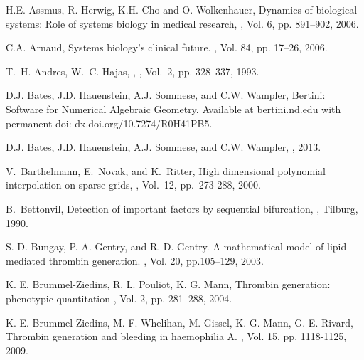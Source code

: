 \begin{thebibliography}{99}

\newblock H.E. Assmus, R. Herwig, K.H. Cho and O. Wolkenhauer,
\newblock Dynamics of biological systems: Role of systems biology in medical research,
, Vol. 6, pp. 891--902, 2006.

\newblock C.A. Arnaud,
\newblock Systems biology's clinical future.
, Vol. 84, pp. 17--26, 2006.


\newblock T.~H. Andres, W.~C. Hajas, ,  , Vol.~2, pp. 328--337, 1993.

 D.J. Bates, J.D. Hauenstein, A.J. Sommese, and C.W. Wampler,
 Bertini\texttrademark: Software for Numerical Algebraic Geometry.
\newblock Available at bertini.nd.edu
           with permanent doi: dx.doi.org/10.7274/R0H41PB5.

 D.J. Bates, J.D. Hauenstein, A.J. Sommese, and C.W. Wampler,
 , 2013.

V.~Barthelmann, E.~Novak, and K.~Ritter, \newblock High dimensional
polynomial interpolation on sparse grids, , Vol.~12,  pp.~273-288, 2000.

\newblock B.~Bettonvil, \newblock Detection of important factors by sequential bifurcation, , Tilburg, 1990.

S. D. Bungay, P. A. Gentry, and R. D. Gentry. \newblock A
mathematical model of lipid-mediated thrombin generation.
, Vol. 20, pp.105--129, 2003.

K. E. Brummel-Ziedins, R. L. Pouliot, K. G. Mann, \newblock Thrombin
generation: phenotypic quantitation , Vol. 2,  pp. 281--288, 2004.

K. E. Brummel-Ziedins, M. F. Whelihan, M. Gissel, K. G. Mann, G. E.
Rivard, \newblock Thrombin generation and bleeding in haemophilia A.
, Vol. 15, pp. 1118-1125, 2009.


\end{thebibliography}
